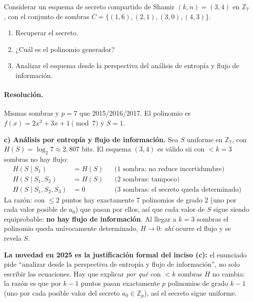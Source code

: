 \documentclass[11pt,a4paper]{article}
\begin{document}
\begin{consignabox}
Considerar un esquema de secreto compartido de Shamir $(k,n)=(3,4)$ en $\mathbb{Z}_7$, con el conjunto de sombras $C=\{(1,6),(2,1),(3,0),(4,3)\}$.
\begin{enumerate}
  \item[a)] Recuperar el secreto.
  \item[b)] ¿Cuál es el polinomio generador?
  \item[c)] Analizar el esquema desde la perspectiva del análisis de entropía y flujo de información.
\end{enumerate}
\end{consignabox}

\paragraph{Resolución.}
Mismas sombras y $p=7$ que 2015/2016/2017. El polinomio es $f(x)=2x^2+3x+1 \pmod 7$ y $S=1$.

\textbf{c) Análisis por entropía y flujo de información.} Sea $S$ uniforme en $\mathbb{Z}_7$, con $H(S)=\log_2 7 \approx 2{,}807$ bits. El esquema $(3,4)$ es válido sii con $<k=3$ sombras no hay flujo:
\begin{align*}
  H(S \mid S_1) &= H(S) & &\text{(1 sombra: no reduce incertidumbre)}\\
  H(S \mid S_1,S_2) &= H(S) & &\text{(2 sombras: tampoco)}\\
  H(S \mid S_1,S_2,S_3) &= 0 & &\text{(3 sombras: el secreto queda determinado)}
\end{align*}
La razón: con $\le 2$ puntos hay exactamente 7 polinomios de grado 2 (uno por cada valor posible de $a_0$) que pasan por ellos, así que cada valor de $S$ sigue siendo equiprobable: \textbf{no hay flujo de información}. Al llegar a $k=3$ sombras el polinomio queda unívocamente determinado, $H\to 0$: \emph{ahí} ocurre el flujo y se revela $S$.

\begin{tipsbox}
\textbf{La novedad en 2025 es la justificación formal del inciso (c):} el enunciado pide ``analizar desde la perspectiva de entropía y flujo de información'', no solo escribir las ecuaciones. Hay que explicar \emph{por qué} con $<k$ sombras $H$ no cambia: la razón es que por $k-1$ puntos pasan exactamente $p$ polinomios de grado $k-1$ (uno por cada posible valor del secreto $a_0 \in \mathbb{Z}_p$), así el secreto sigue uniforme.
\end{tipsbox}
\end{document}
